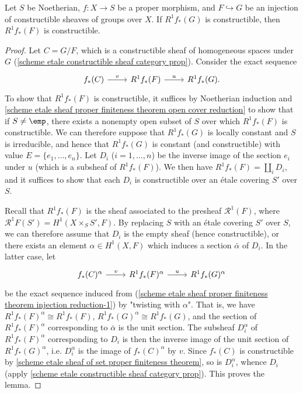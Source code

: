 \begin{lemma}\label{scheme etale sheaf proper finiteness theorem injection reduction}
Let $S$ be Noetherian, $f:X\to S$ be a proper morphism, and $F\hookrightarrow G$ be an injection of constructible sheaves of groups over $X$. If $R^1f_*(G)$ is constructible, then $R^1f_*(F)$ is constructible.
\end{lemma}
\begin{proof}
Let $C=G/F$, which is a constructible sheaf of homogeneous spaces under $G$ (\cref{scheme etale constructible sheaf category prop}). Consider the exact sequence
\begin{equation}\label{scheme etale sheaf proper finiteness theorem injection reduction-1}
\begin{tikzcd}
f_*(C)\ar[r,"v"]&R^1f_*(F)\ar[r,"u"]&R^1f_*(G).
\end{tikzcd}
\end{equation}
To show that $R^1f_*(F)$ is constructible, it suffices by Noetherian induction and \cref{scheme etale sheaf proper finiteness theorem open cover reduction} to show that if $S\neq\emp$, there exists a nonempty open subset of $S$ over which $R^1f_*(F)$ is constructible. We can therefore suppose that $R^1f_*(G)$ is locally constant and $S$ is irreducible, and hence that $R^1f_*(G)$ is constant (and constructible) with value $E=\{e_1,\dots,e_n\}$. Let $D_i$ ($i=1,\dots, n$) be the inverse image of the section $e_i$ under $u$ (which is a subsheaf of $R^1f_*(F)$). We then have $R^1f_*(F)=\amalg_iD_i$, and it suffices to show that each $D_i$ is constructible over an \'etale covering $S'$ over $S$.\par
Recall that $R^1f_*(F)$ is the sheaf associated to the presheaf $\mathcal{R}^1(F)$, where $\mathcal{R}^1F(S')=H^1(X\times_SS',F)$. By replacing $S$ with an \'etale covering $S'$ over $S$, we can therefore assume that $D_i$ is the empty sheaf (hence constructible), or there exists an element $\alpha\in H^1(X,F)$ which induces a section $\bar{\alpha}$ of $D_i$. In the latter case, let
\[\begin{tikzcd}
f_*(C)^\alpha\ar[r,"v"]&R^1f_*(F)^\alpha\ar[r,"u"]&R^1f_*(G)^\alpha
\end{tikzcd}\]
be the exact sequence induced from (\ref{scheme etale sheaf proper finiteness theorem injection reduction-1}) by "twisting with $\alpha$". That is, we have $R^1f_*(F)^\alpha\cong R^1f_*(F)$, $R^1f_*(G)^\alpha\cong R^1f_*(G)$, and the section of $R^1f_*(F)^\alpha$ corresponding to $\bar{\alpha}$ is the unit section. The subsheaf $D_i^\alpha$ of $R^1f_*(F)^\alpha$ corresponding to $D_i$ is then the inverse image of the unit section of $R^1f_*(G)^\alpha$, i.e. $D_i^\alpha$ is the image of $f_*(C)^\alpha$ by $v$. Since $f_*(C)$ is constructible by \cref{scheme etale sheaf of set proper finiteness theorem}, so is $D_i^\alpha$, whence $D_i$ (apply \cref{scheme etale constructible sheaf category prop}). This proves the lemma.
\end{proof}

